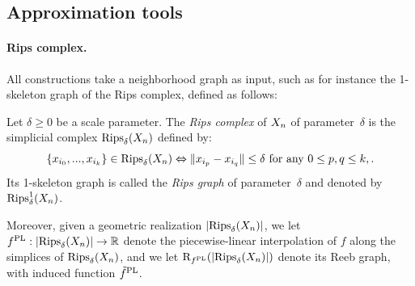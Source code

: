 \subsection{Approximation tools}
\label{sec:tools}


\paragraph*{Rips complex.} All constructions take a neighborhood graph as
input, such as for instance the 1-skeleton graph of the Rips complex, defined as follows:
%
\begin{defin}
Let $\delta \geq 0$ be a scale parameter.
The \emph{Rips complex} of $X_n$ of parameter~$\delta$ is
the simplicial complex $\mathrm{Rips}_\delta(X_n)$ defined by:
%
\[ 
\{x_{i_0},...,x_{i_k}\}\in\mathrm{Rips}_\delta(X_n)\Leftrightarrow \|x_{i_p}-x_{i_q}\|\leq\delta\text{ for any }0\leq p,q\leq k,. 
\]
%
Its 1-skeleton graph is called the {\em Rips graph} of parameter~$\delta$ and denoted by~$\mathrm{Rips}_\delta^1(X_n)$.

Moreover, given a geometric realization $|\mathrm{Rips}_\delta(X_n)|$,
we let ${f}^{\rm PL}:|\mathrm{Rips}_\delta(X_n)|\rightarrow\mathbb{R}$ denote the piecewise-linear
interpolation of $f$ along the simplices of $\mathrm{Rips}_\delta(X_n)$, and
we let $\mathrm{R}_{{f}^{\rm PL}}(|\mathrm{Rips}_\delta(X_n)|)$ 
denote its Reeb graph, with induced function ${\tilde{f}}^{\rm PL}$.
\end{defin} 


